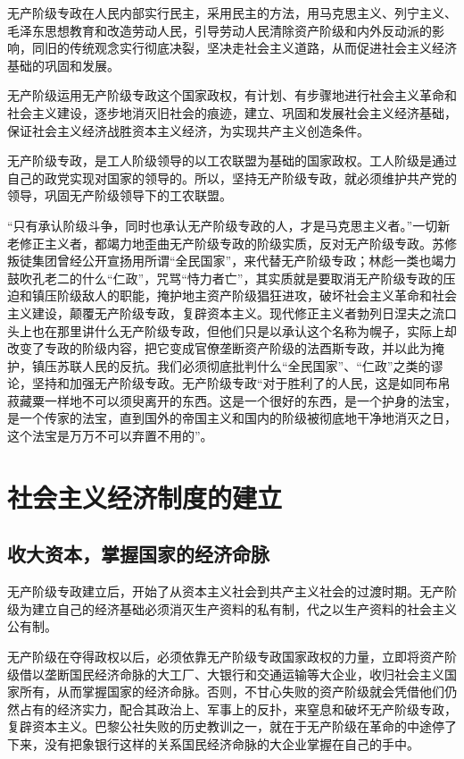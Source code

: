 \documentclass{book}
\begin{document}
无产阶级专政在人民内部实行民主，采用民主的方法，用马克思主义、列宁主义、毛泽东思想教育和改造劳动人民，引导劳动人民清除资产阶级和内外反动派的影响，同旧的传统观念实行彻底决裂，坚决走社会主义道路，从而促进社会主义经济基础的巩固和发展。

无产阶级运用无产阶级专政这个国家政权，有计划、有步骤地进行社会主义革命和社会主义建设，逐步地消灭旧社会的痕迹，建立、巩固和发展社会主义经济基础，保证社会主义经济战胜资本主义经济，为实现共产主义创造条件。

无产阶级专政，是工人阶级领导的以工农联盟为基础的国家政权。工人阶级是通过自己的政党实现对国家的领导的。所以，坚持无产阶级专政，就必须维护共产党的领导，巩固无产阶级领导下的工农联盟。

“只有承认阶级斗争，同时也承认无产阶级专政的人，才是马克思主义者。”一切新老修正主义者，都竭力地歪曲无产阶级专政的阶级实质，反对无产阶级专政。苏修叛徒集团曾经公开宣扬用所谓“全民国家”，来代替无产阶级专政；林彪一类也竭力鼓吹孔老二的什么“仁政”，咒骂“恃力者亡”，其实质就是要取消无产阶级专政的压迫和镇压阶级敌人的职能，掩护地主资产阶级猖狂进攻，破坏社会主义革命和社会主义建设，颠覆无产阶级专政，复辟资本主义。现代修正主义者勃列日涅夫之流口头上也在那里讲什么无产阶级专政，但他们只是以承认这个名称为幌子，实际上却改变了专政的阶级内容，把它变成官僚垄断资产阶级的法酉斯专政，并以此为掩护，镇压苏联人民的反抗。我们必须彻底批判什么“全民国家”、“仁政”之类的谬论，坚持和加强无产阶级专政。无产阶级专政“对于胜利了的人民，这是如同布帛菽藏粟一样地不可以须臾离开的东西。这是一个很好的东西，是一个护身的法宝，是一个传家的法宝，直到国外的帝国主义和国内的阶级被彻底地干净地消灭之日，这个法宝是万万不可以弃置不用的”。

\section{社会主义经济制度的建立}

\subsection{收大资本，掌握国家的经济命脉}

无产阶级专政建立后，开始了从资本主义社会到共产主义社会的过渡时期。无产阶级为建立自己的经济基础必须消灭生产资料的私有制，代之以生产资料的社会主义公有制。

无产阶级在夺得政权以后，必须依靠无产阶级专政国家政权的力量，立即将资产阶级借以垄断国民经济命脉的大工厂、大银行和交通运输等大企业，收归社会主义国家所有，从而掌握国家的经济命脉。否则，不甘心失败的资产阶级就会凭借他们仍然占有的经济实力，配合其政治上、军事上的反扑，来窒息和破坏无产阶级专政，复辟资本主义。巴黎公社失败的历史教训之一，就在于无产阶级在革命的中途停了下来，没有把象银行这样的关系国民经济命脉的大企业掌握在自己的手中。
\end{document}
